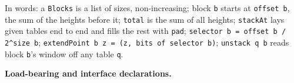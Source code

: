 
In words: a \texttt{Blocks} is a list of sizes, non-increasing; block \texttt{b} starts at \texttt{offset b}, the sum of the heights before it; \texttt{total} is the sum of all heights; \texttt{stackAt} lays given tables end to end and fills the rest with \texttt{pad}; \texttt{s\allowbreak{}e\allowbreak{}l\allowbreak{}e\allowbreak{}c\allowbreak{}t\allowbreak{}o\allowbreak{}r\allowbreak{} b\allowbreak{} =\allowbreak{} o\allowbreak{}f\allowbreak{}f\allowbreak{}s\allowbreak{}e\allowbreak{}t\allowbreak{} b\allowbreak{} /\allowbreak{} 2\allowbreak{}\textasciicircum{}\allowbreak{}s\allowbreak{}i\allowbreak{}z\allowbreak{}e\allowbreak{} b}; \texttt{e\allowbreak{}x\allowbreak{}t\allowbreak{}e\allowbreak{}n\allowbreak{}d\allowbreak{}P\allowbreak{}o\allowbreak{}i\allowbreak{}n\allowbreak{}t\allowbreak{} b\allowbreak{} z\allowbreak{} =\allowbreak{} (\allowbreak{}z\allowbreak{},\allowbreak{} b\allowbreak{}i\allowbreak{}t\allowbreak{}s\allowbreak{} o\allowbreak{}f\allowbreak{} s\allowbreak{}e\allowbreak{}l\allowbreak{}e\allowbreak{}c\allowbreak{}t\allowbreak{}o\allowbreak{}r\allowbreak{} b\allowbreak{})}; \texttt{unstack q b} reads block \texttt{b}'s window off any table \texttt{q}.

\par\medskip\noindent\textbf{Load-bearing and interface declarations.}

